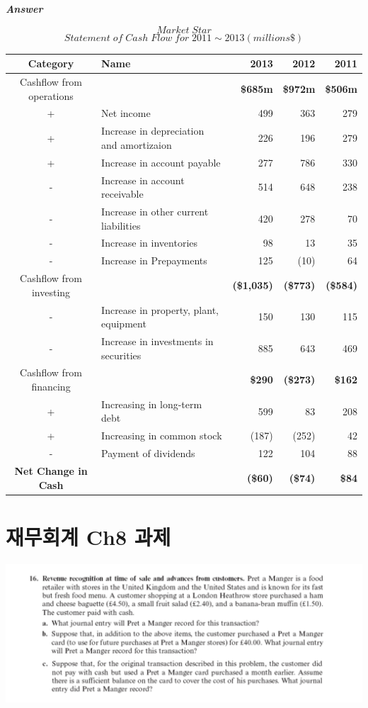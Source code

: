 \documentclass[
  letterpaper,
  DIV=11,
  numbers=noendperiod]{scrreprt}
\begin{document}
\textbf{\emph{Answer}}

\[Market\;Star\]
\[Statement\;of\;Cash\;Flow\;for\;2011\sim 2013(millions\$)\]

\begin{longtable}[]{@{}clrrr@{}}
\toprule\noalign{}
Category & Name & 2013 & 2012 & 2011 \\
\midrule\noalign{}
\endhead
\bottomrule\noalign{}
\endlastfoot
Cashflow from operations & & \textbf{\$685m} & \textbf{\$972m} &
\textbf{\$506m} \\
+ & Net income & 499 & 363 & 279 \\
+ & Increase in depreciation and amortizaion & 226 & 196 & 279 \\
+ & Increase in account payable & 277 & 786 & 330 \\
- & Increase in account receivable & 514 & 648 & 238 \\
- & Increase in other current liabilities & 420 & 278 & 70 \\
- & Increase in inventories & 98 & 13 & 35 \\
- & Increase in Prepayments & 125 & (10) & 64 \\
Cashflow from investing & & \textbf{(\$1,035)} & \textbf{(\$773)} &
\textbf{(\$584)} \\
- & Increase in property, plant, equipment & 150 & 130 & 115 \\
- & Increase in investments in securities & 885 & 643 & 469 \\
Cashflow from financing & & \textbf{\$290} & \textbf{(\$273)} &
\textbf{\$162} \\
+ & Increasing in long-term debt & 599 & 83 & 208 \\
+ & Increasing in common stock & (187) & (252) & 42 \\
- & Payment of dividends & 122 & 104 & 88 \\
\textbf{Net Change in Cash} & & \textbf{(\$60)} & \textbf{(\$74)} &
\textbf{\$84} \\
\end{longtable}

\chapter*{재무회계 Ch8
과제}\label{uxc7acuxbb34uxd68cuxacc4-ch8-uxacfcuxc81c}


\includegraphics{images/재무회계8-16.png}
\end{document}
